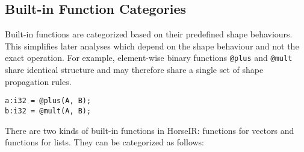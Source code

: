 

\subsection{Built-in Function Categories}\label{SubSec:groups}

Built-in functions are categorized based on their predefined shape behaviours.
This simplifies later analyses which depend on the shape behaviour and not
the exact operation. For example, element-wise binary functions \texttt{@plus}
and \texttt{@mult} share identical structure and may therefore share a single
set of shape propagation rules.
\begin{small}
\begin{Verbatim}[xleftmargin=.3\columnwidth]
a:i32 = @plus(A, B);
b:i32 = @mult(A, B);
\end{Verbatim}
\end{small}
There are two kinds of built-in functions in HorseIR: functions for vectors and
functions for lists. They can be categorized as follows:

